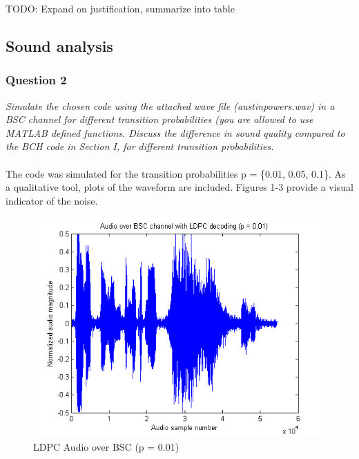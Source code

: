 \documentclass[a4paper]{article}
\begin{document}
TODO: Expand on justification, summarize into table

\subsection{Sound analysis}

\subsubsection{Question 2} \textit{Simulate the chosen code using the attached wave file (austinpowers.wav) in a BSC channel for different transition probabilities (you are allowed to use MATLAB defined functions. Discuss the difference in sound quality compared to the BCH code in Section I, for different transition probabilities.}\\
\\


The code was simulated for the transition probabilities p = \{0.01, 0.05, 0.1\}. As a qualitative tool, plots of the waveform are included. Figures 1-3 provide a visual indicator of the noise. \\

\begin{figure}[H]
\centering
\includegraphics[scale=0.5]{plots/audio_over_bsc_ldpc_p_001.png}
\caption{LDPC Audio over BSC (p = 0.01)}
\end{figure}
\end{document}

